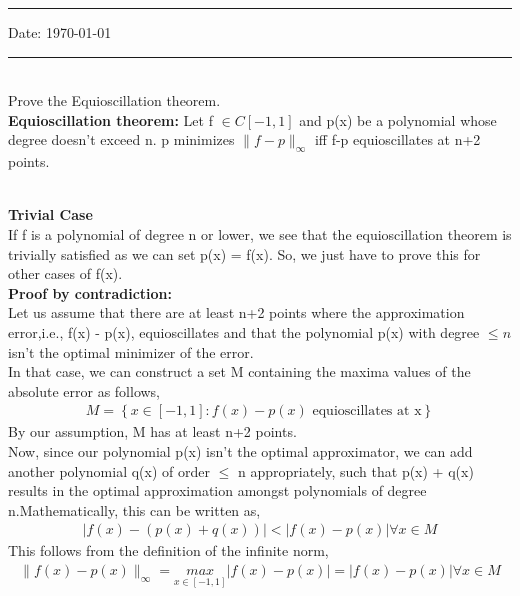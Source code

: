 \documentclass[letterpaper]{exam}
\begin{document}
\hrule
\vspace{3mm}
\noindent 
\vspace{3mm}

\noindent
{{\sf Date: \today }} %



\vspace{3mm}
\hrule
\begin{questions}
\\
Prove the Equioscillation theorem.\\
\textbf{Equioscillation theorem:} Let f $\in C\left[-1,1\right]$ and p(x) be a polynomial whose degree doesn't exceed n. p minimizes $\parallel f-p\parallel_{\infty}$ iff f-p equioscillates at n+2 points.
\begin{solution}
\\
\textbf{Trivial Case}\\
If f is a polynomial of degree n or lower, we see that the equioscillation theorem is trivially satisfied as we can set p(x) = f(x). So, we just have to prove this for other cases of f(x).
\\
\textbf{Proof by contradiction:}\\
Let us assume that there are at least n+2 points where the approximation error,i.e., f(x) - p(x), equioscillates and that the polynomial p(x) with degree $\leq n$ isn't the optimal minimizer of the error.\\
In that case, we can construct a set M containing the maxima values of the absolute error as follows,
\begin{align*}
    M = \left\{x \in [-1,1]: f(x) - p(x) \mbox{ equioscillates at x}\right\}
\end{align*}
By our assumption, M has at least n+2 points.\\
Now, since our polynomial p(x) isn't the optimal approximator, we can add another polynomial q(x) of order $\leq$ n  appropriately, such that p(x) + q(x) results in the optimal approximation amongst polynomials of degree n.Mathematically, this can be written as,
\begin{align*}
    \left| f(x)-(p(x)+q(x))\right| < \left| f(x)-p(x)\right| \forall x \in M 
\end{align*}
This follows from the definition of the infinite norm,
\begin{align*}
    \parallel f(x)-p(x)\parallel_{\infty} = \underset{x \in [-1,1]}{max } \left| f(x)-p(x)\right| = \left| f(x)-p(x)\right| \forall x \in M 

\end{align*}
\end{solution}
\end{questions}
\end{document}
